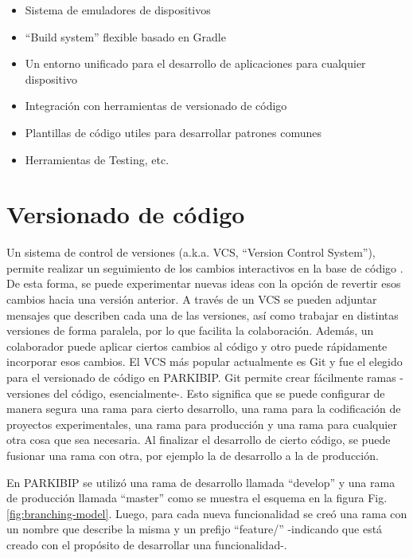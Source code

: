 \begin{itemize}
    \item Sistema de emuladores de dispositivos 
    \item ``Build system'' flexible basado en Gradle 
    \item Un entorno unificado para el desarrollo de aplicaciones para cualquier dispositivo
    \item Integración con herramientas de versionado de código 
    \item Plantillas de código utiles para desarrollar patrones comunes 
    \item Herramientas de Testing, etc.
\end{itemize}

\section{Versionado de código}\label{project:version-control}

Un sistema de control de versiones (a.k.a. VCS, ``Version Control System''), permite realizar un seguimiento de los cambios interactivos en la base de código \cite{Blischak2016}. De esta forma, se puede experimentar nuevas ideas con la opción de revertir esos cambios hacia una versión anterior. A través de un VCS se pueden adjuntar mensajes que describen cada una de las versiones, así como trabajar en distintas versiones de forma paralela, por lo que facilita la colaboración. Además, un colaborador puede aplicar ciertos cambios al código y otro puede rápidamente incorporar esos cambios. 
El VCS más popular actualmente es Git \cite{Blischak2016} y fue el elegido para el versionado de código en PARKIBIP. Git permite crear fácilmente ramas -versiones del código, esencialmente-. Esto significa que se puede configurar de manera segura una rama para cierto desarrollo, una rama para la codificación de proyectos experimentales, una rama para producción y una rama para cualquier otra cosa que sea necesaria. Al finalizar el desarrollo de cierto código, se puede fusionar una rama con otra, por ejemplo la de desarrollo a la de producción. 

En PARKIBIP se utilizó una rama de desarrollo llamada ``develop'' y una rama de producción llamada ``master'' como se muestra el esquema en la figura Fig. \ref{fig:branching-model}. Luego, para cada nueva funcionalidad se creó una rama con un nombre que describe la misma y un prefijo ``feature/'' -indicando que está creado con el propósito de desarrollar una funcionalidad-.

